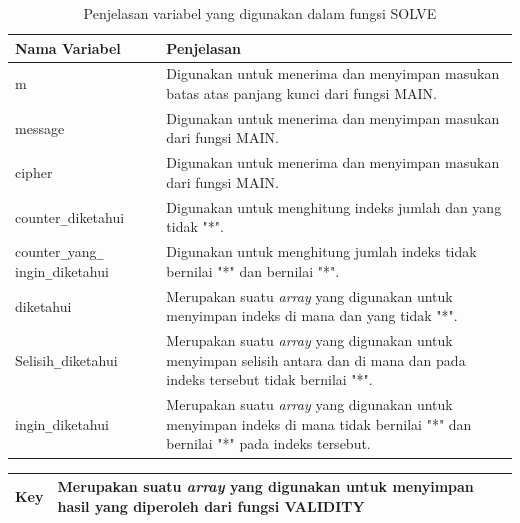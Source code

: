 	\begin{table}[H]
	 	\caption{Penjelasan variabel yang digunakan dalam fungsi SOLVE}
		\begin{tabular}   {|p{3cm}|p{6cm}|}\hline
		Nama Variabel&Penjelasan \\ \hline
		m&Digunakan untuk menerima dan menyimpan masukan batas atas panjang kunci dari fungsi MAIN. \\ \hline
		message&Digunakan untuk menerima dan menyimpan masukan \plaintext dari fungsi MAIN.\\ \hline
		cipher&Digunakan untuk menerima dan menyimpan masukan \ciphertext dari fungsi MAIN. \\ \hline
		counter\verb|_|diketahui&Digunakan untuk menghitung indeks jumlah \plaintext dan \ciphertext yang tidak "*". \\ \hline
		counter\verb|_|yang\verb|_| ingin\verb|_|diketahui&Digunakan untuk menghitung jumlah indeks \ciphertext tidak bernilai "*" dan \plaintext bernilai "*". \\ \hline
		diketahui&Merupakan suatu \textit{array} yang digunakan untuk menyimpan indeks di mana \plaintext dan \ciphertext yang tidak "*". \\ \hline
		Selisih\verb|_|diketahui&Merupakan suatu \textit{array} yang digunakan untuk menyimpan selisih antara \plaintext dan \ciphertext di mana \plaintext dan \ciphertext pada indeks tersebut tidak bernilai "*". \\ \hline
		ingin\verb|_|diketahui&Merupakan suatu \textit{array} yang digunakan untuk menyimpan indeks di mana  \ciphertext tidak bernilai "*" dan \plaintext bernilai "*" pada indeks tersebut. \\ \hline
		\end{tabular}%
		\label{tab:solvar}
	\end{table}
  	\begin{table}[H]
	 	
		\begin{tabular}   {|p{3cm}|p{6cm}|}\hline
		
		
		Key&Merupakan suatu \textit{array} yang digunakan untuk menyimpan hasil yang diperoleh dari fungsi VALIDITY \\ \hline
		\end{tabular}%
		\label{tab:solvar}
	\end{table}	
	
	
